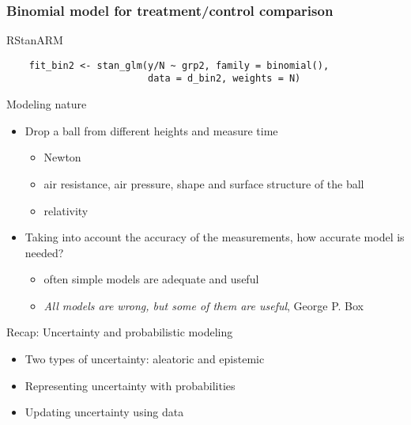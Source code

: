 \documentclass[10pt]{beamer}
\begin{document}
\begin{frame}[fragile]
  \frametitle{Binomial model for treatment/control comparison}

  RStanARM
  {\scriptsize
  \begin{lstlisting}
    fit_bin2 <- stan_glm(y/N ~ grp2, family = binomial(),
                         data = d_bin2, weights = N)
  \end{lstlisting}
}
\end{frame}


\begin{frame}{Modeling nature}

  \begin{itemize}
  \item Drop a ball from different heights and measure time
    \pause
    \begin{itemize}
    \item Newton
    \item air resistance, air pressure, shape and surface structure of the ball
    \item relativity
    \end{itemize}
    \pause
  \item Taking into account the accuracy of the measurements, how
    accurate model is needed?
    \pause
    \begin{itemize}
    \item often simple models are adequate and useful
    \item \emph{All models are wrong, but some of them are useful},
      George P. Box
    \end{itemize}
  \end{itemize}

\end{frame}

\begin{frame}{Recap: Uncertainty and probabilistic modeling}

  \begin{itemize}
  \item Two types of uncertainty: aleatoric and epistemic
    \vspace{\baselineskip}
  \item Representing uncertainty with probabilities
    \vspace{\baselineskip}
  \item Updating uncertainty using data
    \vspace{\baselineskip}
   \end{itemize}
\end{frame}
\end{document}
